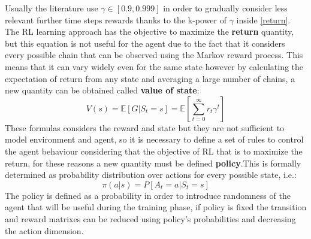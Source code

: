 Usually the literature use $\gamma \in [0.9, 0.999]$ in order to gradually consider less relevant further time steps rewards thanks to the k-power of $\gamma$ inside \ref{return}.
The RL learning approach has the objective to maximize the \textbf{return} quantity, but this equation is not useful for the agent due to the fact that it considers every possible chain that can be observed using the Markov reward process. This means that it can vary widely even for the same state however by calculating the expectation of return from any state and  averaging a large number of chains, a new quantity can be obtained called \textbf{value of state}:
\begin{equation}
	V(s) = \mathbb{E}[G | S_t = s] = \mathbb{E}[\sum_{t=0}^{\infty} r_t \gamma^t]
\end{equation}
These formulas considers the reward and state but they are not sufficient to model environment and agent, so it is necessary to define a set of rules to control the agent behaviour considering that the objective of RL that is to maximize the return, for these reasons a new quantity must be defined \textbf{policy}.This is formally determined as probability distribution over actions for every possible state, i.e.:
\begin{equation}\label{policy}
	\pi(a|s) = P[A_t = a | S_t = s]
\end{equation}
The policy is defined as a probability in order to introduce randomness of the agent that will be useful during the training phase, if policy is fixed the transition and reward matrixes can be reduced using policy's probabilities and decreasing the action dimension.
